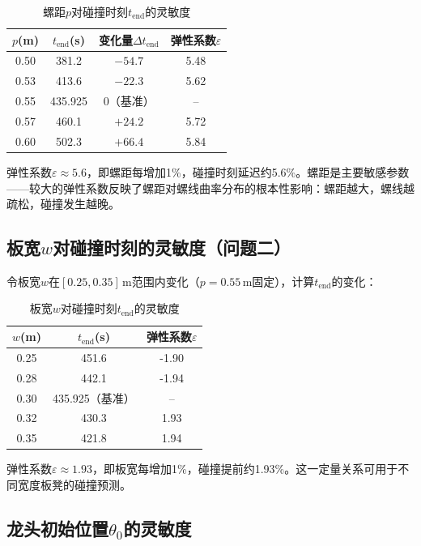 \documentclass[12pt]{ctexart}
\begin{document}
\begin{table}[htbp]
\centering
\caption{螺距$p$对碰撞时刻$t_{\text{end}}$的灵敏度}
\label{tab:sens1}
\begin{tabular}{cccc}
\toprule
$p$(m) & $t_{\text{end}}$(s) & 变化量$\Delta t_{\text{end}}$ & 弹性系数$\varepsilon$ \\
\midrule
0.50 & 381.2 & $-54.7$ & 5.48 \\
0.53 & 413.6 & $-22.3$ & 5.62 \\
0.55 & 435.925 & 0（基准） & -- \\
0.57 & 460.1 & $+24.2$ & 5.72 \\
0.60 & 502.3 & $+66.4$ & 5.84 \\
\bottomrule
\end{tabular}
\end{table}

弹性系数$\varepsilon\approx 5.6$，即螺距每增加1\%，碰撞时刻延迟约5.6\%。螺距是主要敏感参数——较大的弹性系数反映了螺距对螺线曲率分布的根本性影响：螺距越大，螺线越疏松，碰撞发生越晚。

\subsection{板宽$w$对碰撞时刻的灵敏度（问题二）}

令板宽$w$在$[0.25,0.35]$\,m范围内变化（$p=0.55$\,m固定），计算$t_{\text{end}}$的变化：

\begin{table}[htbp]
\centering
\caption{板宽$w$对碰撞时刻$t_{\text{end}}$的灵敏度}
\label{tab:sens2}
\begin{tabular}{ccc}
\toprule
$w$(m) & $t_{\text{end}}$(s) & 弹性系数$\varepsilon$ \\
\midrule
0.25 & 451.6 & -1.90 \\
0.28 & 442.1 & -1.94 \\
0.30 & 435.925（基准） & -- \\
0.32 & 430.3 & 1.93 \\
0.35 & 421.8 & 1.94 \\
\bottomrule
\end{tabular}
\end{table}

弹性系数$\varepsilon\approx 1.93$，即板宽每增加1\%，碰撞提前约1.93\%。这一定量关系可用于不同宽度板凳的碰撞预测。

\subsection{龙头初始位置$\theta_0$的灵敏度}
\end{document}
